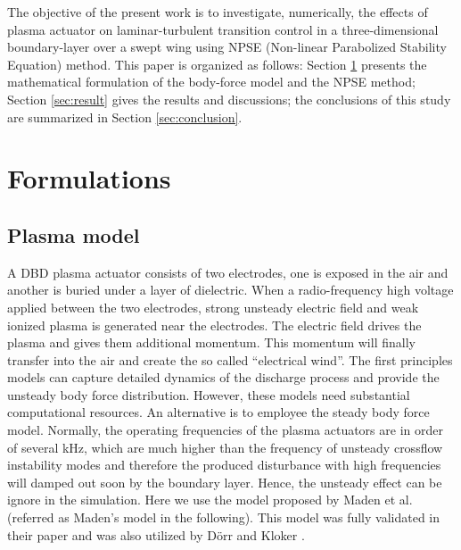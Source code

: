 \documentclass{AIAA}
\begin{document}
The objective of the present work is to investigate, numerically, the effects of plasma actuator on laminar-turbulent transition control in a three-dimensional boundary-layer over a swept wing using NPSE (Non-linear Parabolized Stability Equation) method. This paper is organized as follows: Section \ref{sec:formulation} presents the mathematical formulation of the body-force model and the NPSE method; Section \ref{sec:result} gives the results and discussions;
the conclusions of this study are summarized in Section \ref{sec:conclusion}.


\section{Formulations}\label{sec:formulation}
\subsection{Plasma model}

A DBD plasma actuator consists of two electrodes, one is exposed in the air and another is buried under a layer of dielectric. When a radio-frequency high voltage applied between the two electrodes, strong unsteady electric field and weak ionized plasma is generated near the electrodes. The electric field drives the plasma and gives them additional momentum. This momentum will finally transfer into the air and create the so called ``electrical wind''. The first principles models\cite{Likhanskii2008,Boeuf2007,Jayaramen2008} can capture detailed dynamics of the discharge process and provide the unsteady body force distribution. However, these models need substantial computational resources. An alternative is to employee the steady body force model. Normally, the operating frequencies of the plasma actuators are in order of several kHz, which are much higher than the frequency of unsteady crossflow instability modes and therefore the produced disturbance with high frequencies will damped out soon by the boundary layer\cite{dorr2015stabilisation}. Hence, the unsteady effect can be ignore in the simulation. Here we use the model proposed by Maden et al.\cite{Maden2013}(referred as Maden's model in the following). This model was fully validated in their paper and was also utilized by D\"orr and Kloker \cite{dorr2015stabilisation,dorr2016}.
\end{document}
